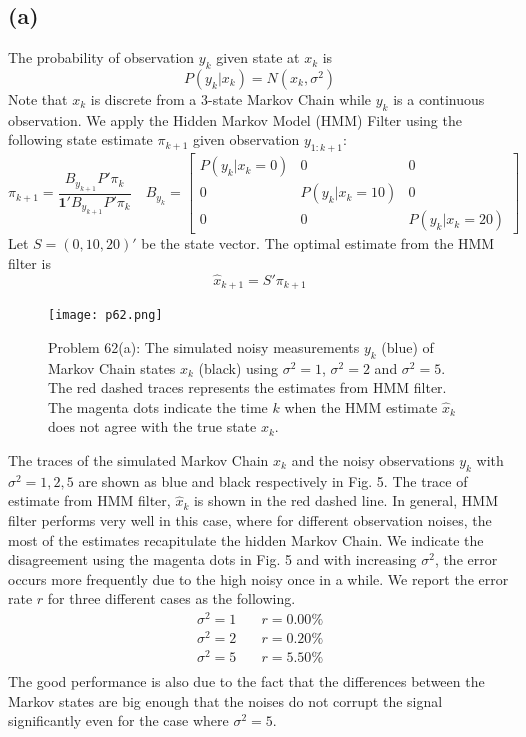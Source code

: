 \documentclass[a4paper, 11pt]{article}
\begin{document}
\subsection*{(a)}

The probability of observation $y_k$ given state at $x_k$ is 
\begin{equation}
P(y_k|x_k) = N(x_k, \sigma^2)
\end{equation}
Note that $x_k$ is discrete from a 3-state Markov Chain while $y_k$ is a continuous observation. We apply the Hidden Markov Model (HMM) Filter using the following state estimate $\pi_{k+1}$ given observation $y_{1:k+1}$: 
\begin{equation}
\pi_{k+1} = \frac{B_{y_{k+1}}P'\pi_k}{\mathbf{1}'B_{y_{k+1}}P'\pi_k} \quad B_{y_k} = \begin{bmatrix}
P(y_k|x_k=0) & 0 & 0 \\
0 & P(y_k|x_k=10) & 0 \\
0 & 0 & P(y_k|x_k=20)
\end{bmatrix}
\end{equation}
Let $S = (0, 10, 20)'$ be the state vector. The optimal estimate from the HMM filter is
\begin{equation}
\hat{x}_{k+1} = S'\pi_{k+1}
\end{equation}

\begin{figure}
	\begin{center}
		\texttt{[image: p62.png]}
		\caption{Problem 62(a): The simulated noisy measurements $y_k$ (blue) of Markov Chain states $x_k$ (black) using $\sigma^2=1$, $\sigma^2=2$ and $\sigma^2=5$. The red dashed traces represents the estimates from HMM filter. The magenta dots indicate the time $k$ when the HMM estimate $\hat{x}_k$ does not agree with the true state $x_k$. } 
	\end{center}
\end{figure}

The traces of the simulated Markov Chain $x_k$ and the noisy observations $y_k$ with $\sigma^2 = 1,2,5$ are shown as blue and black respectively in Fig. 5. The trace of estimate from HMM filter, $\hat{x}_k$ is shown in the red dashed line. In general, HMM filter performs very well in this case, where for different observation noises, the most of the estimates recapitulate the hidden Markov Chain. We indicate the disagreement using the magenta dots in Fig. 5 and with increasing $\sigma^2$, the error occurs more frequently due to the high noisy once in a while. We report the error rate $r$ for three different cases as the following. 
\begin{equation}
\begin{split}
\sigma^2 = 1 \quad & r = 0.00\% \\
\sigma^2 = 2 \quad & r = 0.20\% \\
\sigma^2 = 5 \quad & r = 5.50\% \\
\end{split}
\end{equation}
The good performance is also due to the fact that the differences between the Markov states are big enough that the noises do not corrupt the signal significantly even for the case where $\sigma^2=5$. 
\end{document}
